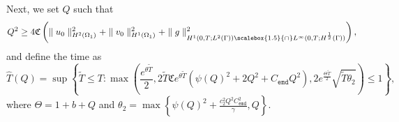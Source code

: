 \documentclass[11pt]{article}
\newcommand*{\medcap}{\mathbin{\scalebox{1.5}{\ensuremath{\cap}}}}
\begin{document}
Next, we set $Q$ such that 
\begin{equation}\label{bound_Q}
Q^2 \geq 4 \mathfrak{C}\left( \parallel u_0\parallel^2_{H^2(\Omega_1)} + \parallel v_0\parallel^2_{H^1(\Omega_1)}  + \parallel g\parallel^2_{H^1(0, T;L^2(\Gamma))\medcap L^{\infty}(0, T;H^{\frac{1}{2}}(\Gamma))} \right),
\end{equation}
and define the time as 
\begin{equation}\label{def_time}
\widehat{T}(Q)=\sup \left\{ \widetilde{T}\leq T: \max\left( \frac{e^{\theta \widetilde{T}}}{2}, 2\widetilde{T}\mathfrak{C}e^{\theta \widetilde{T}} \left(  \psi(Q)^2 +2Q^2 + C_{\texttt{emd}}Q^2 \right), 2e^{\frac{\Theta \widetilde{T}}{2}}\sqrt{\widetilde{T}\theta_2} \right) \leq 1
\right\},
\end{equation}
where $\Theta = 1+b+ Q$ and $\theta_2 = \max \left\{ \psi(Q)^2 + \frac{c_2^2 Q^2C_{\texttt{emd}}^2}{\gamma}, Q \right\}$. 
\end{document}
